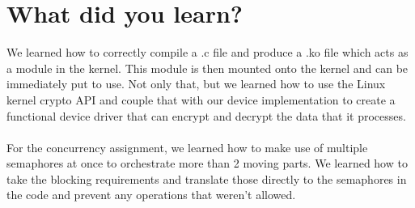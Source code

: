 \documentclass{article}
\begin{document}
\section{What did you learn?}
We learned how to correctly compile a .c file and produce a .ko file which acts as a module
in the kernel. This module is then mounted onto the kernel and can be immediately put to use.
Not only that, but we learned how to use the Linux kernel crypto API and couple that with our
device implementation to create a functional device driver that can encrypt and decrypt the
data that it processes.
\\\\
For the concurrency assignment, we learned how to make use of multiple semaphores at once
to orchestrate more than 2 moving parts. We learned how to take the blocking requirements
and translate those directly to the semaphores in the code and prevent any operations that
weren't allowed.
\end{document}
